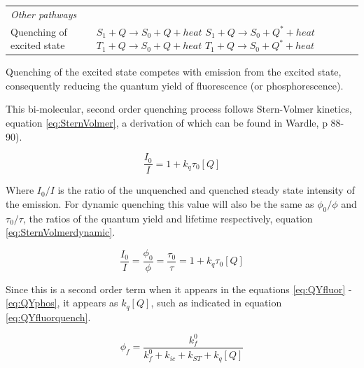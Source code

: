 \documentclass[
]{book}
\begin{document}
\begin{longtable}[]{@{}ll@{}}
\toprule
\endhead
\begin{minipage}[t]{0.56\columnwidth}\raggedright
\emph{Other pathways}\strut
\end{minipage} & \begin{minipage}[t]{0.38\columnwidth}\raggedright
\strut
\end{minipage}\tabularnewline
\begin{minipage}[t]{0.56\columnwidth}\raggedright
Quenching of excited state\strut
\end{minipage} & \begin{minipage}[t]{0.38\columnwidth}\raggedright
\(S_1 + Q \longrightarrow S_0 + Q +heat\) \(S_1 + Q \longrightarrow S_0 + Q^\ast +heat\) \(T_1 + Q \longrightarrow S_0 + Q +heat\) \(T_1 + Q \longrightarrow S_0 + Q^\ast +heat\)\strut
\end{minipage}\tabularnewline
\bottomrule
\end{longtable}

Quenching of the excited state competes with emission from the excited state, consequently reducing the quantum yield of fluorescence (or phosphorescence).

This bi-molecular, second order quenching process follows Stern-Volmer kinetics, equation \eqref{eq:SternVolmer}, a derivation of which can be found in Wardle, p 88-90).

\begin{equation}
\frac{I_0}{I}=1 + k_q \tau _0 [Q]
\label{eq:SternVolmer}
\end{equation}

Where \(I_0 / I\) is the ratio of the unquenched and quenched steady state intensity of the emission. For dynamic quenching this value will also be the same as \(\phi _0 / \phi\) and \(\tau _0 / \tau\), the ratios of the quantum yield and lifetime respectively, equation \eqref{eq:SternVolmerdynamic}.

\begin{equation}
\frac{I_0}{I}=\frac{\phi_0}{\phi}=\frac{\tau_0}{\tau}=1 + k_q \tau _0 [Q]
\label{eq:SternVolmerdynamic}
\end{equation}

Since this is a second order term when it appears in the equations \eqref{eq:QYfluor} - \eqref{eq:QYphos}, it appears as \(k_q[Q]\), such as indicated in equation \eqref{eq:QYfluorquench}.

\begin{equation}
\phi_f = \frac{k_f^0}{k_f^0+k_{ic}+ k_{ST}+k_q[Q]}
\label{eq:QYfluorquench}
\end{equation}
\end{document}

